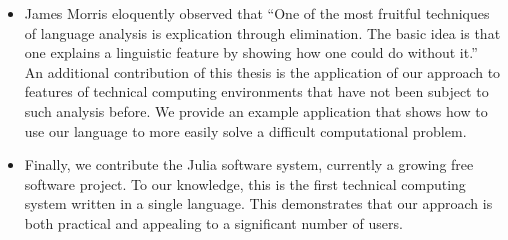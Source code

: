\begin{itemize}

\item James Morris eloquently observed that
``One of the most fruitful techniques of language analysis is explication through
elimination.
The basic idea is that one explains a linguistic feature by showing
how one could do without it.''~\cite{morris}
An additional contribution of this thesis is the application of our approach to
features of technical computing environments that have not been subject to such
analysis before.
We provide an example application that shows how to use our language to
more easily solve a difficult computational problem.


\item Finally, we contribute the Julia software system, currently a
growing free software project.
To our knowledge, this is the first technical computing system written in a
single language.
This demonstrates that our approach is both practical and appealing to a
significant number of users.

\end{itemize}
